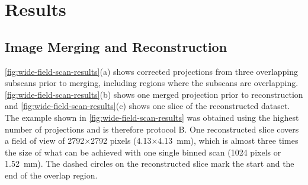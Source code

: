 \section{Results}\label{sec:Results}
\subsection{Image Merging and Reconstruction}\label{sec:Image Merging and Reconstruction}
\autoref{fig:wide-field-scan-results}(a) shows corrected projections from three overlapping subscans prior to merging, including regions where the subscans are overlapping. \autoref{fig:wide-field-scan-results}(b) shows one merged projection prior to reconstruction and \autoref{fig:wide-field-scan-results}(c) shows one slice of the reconstructed dataset. The example shown in \autoref{fig:wide-field-scan-results} was obtained using the highest number of projections and is therefore protocol B. One reconstructed slice covers a field of view of 2792$\times$2792 pixels (4.13$\times$\SI{4.13}{\milli\meter}), which is almost three times the size of what can be achieved with one single binned scan (1024 pixels or \SI{1.52}{\milli\meter}). %
The dashed circles on the reconstructed slice mark the start and the end of the overlap region.

